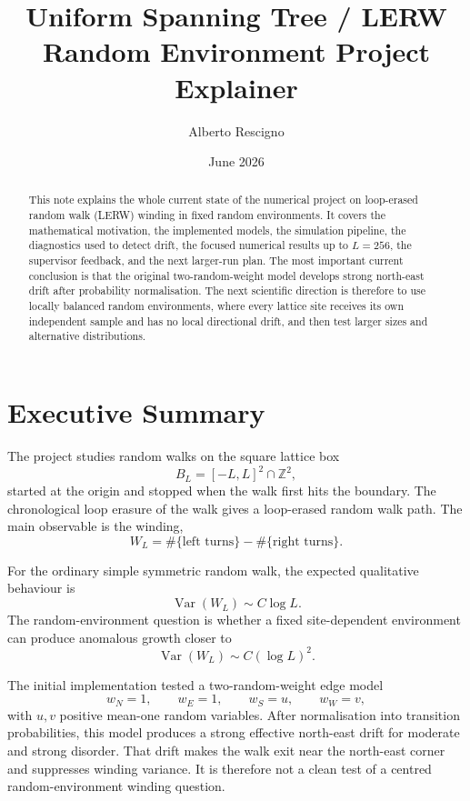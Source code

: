 \documentclass[11pt]{article}
\title{Uniform Spanning Tree / LERW Random Environment Project Explainer}
\author{Alberto Rescigno}
\date{June 2026}
\begin{document}
\maketitle

\begin{abstract}
This note explains the whole current state of the numerical project on
loop-erased random walk (LERW) winding in fixed random environments. It covers
the mathematical motivation, the implemented models, the simulation pipeline,
the diagnostics used to detect drift, the focused numerical results up to
$L=256$, the supervisor feedback, and the next larger-run plan. The most
important current conclusion is that the original two-random-weight model
develops strong north-east drift after probability normalisation. The next
scientific direction is therefore to use locally balanced random environments,
where every lattice site receives its own independent sample and has no local
directional drift, and then test larger sizes and alternative distributions.
\end{abstract}

\tableofcontents
\newpage

\section{Executive Summary}

The project studies random walks on the square lattice box
\[
  B_L = [-L,L]^2 \cap \mathbb{Z}^2,
\]
started at the origin and stopped when the walk first hits the boundary. The
chronological loop erasure of the walk gives a loop-erased random walk path.
The main observable is the winding,
\[
  W_L = \#\{\text{left turns}\} - \#\{\text{right turns}\}.
\]

For the ordinary simple symmetric random walk, the expected qualitative
behaviour is
\[
  \operatorname{Var}(W_L) \sim C \log L.
\]
The random-environment question is whether a fixed site-dependent environment
can produce anomalous growth closer to
\[
  \operatorname{Var}(W_L) \sim C(\log L)^2.
\]

The initial implementation tested a two-random-weight edge model
\[
  w_N = 1,\qquad w_E = 1,\qquad w_S = u,\qquad w_W = v,
\]
with $u,v$ positive mean-one random variables. After normalisation into
transition probabilities, this model produces a strong effective north-east
drift for moderate and strong disorder. That drift makes the walk exit near the
north-east corner and suppresses winding variance. It is therefore not a clean
test of a centred random-environment winding question.
\end{document}
